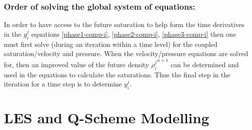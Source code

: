 \subsubsection{Order of solving the global system of equations:} In order to have access to 
the future saturation to help form the time derivatives in the $y_i^j$ 
equations 
\ref{phase1-comp-i}, \ref{phase2-comp-i}, \ref{phase3-comp-i} then one must first solve 
(during an iteration within a time level) for the coupled saturation/velocity and 
pressure. When the velocity/pressure equations are solved for, then an improved 
value of the future density ${\rho^j_i}^{n+1}$ can be determined and used in 
the equations to calculate the saturations. Thus the final step in the iteration 
for a time step is to determine $y_i^j$. 




\pagebreak


\section{LES and Q-Scheme Modelling} 
\label{LES and Q-Scheme Modelling} 



